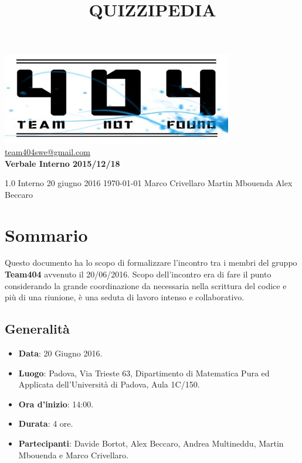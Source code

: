 \documentclass[a4paper,11pt]{article}
\title{\textbf{{\fontsize{10mm}{6mm}\selectfont QUIZZIPEDIA}}}
\begin{document}
	\maketitle
	
	\begin{center}

	\includegraphics{../../../team_not_found.jpg}\\	
	\fontsize{5mm}{3mm}\url{team404swe@gmail.com}\\
	\vspace{40mm}
	\textbf{ Verbale Interno 2015/12/18 }
	\end{center}
	\thispagestyle{empty}	%
			{1.0} 							%
			{Interno} 						%
			{20 giugno 2016} 				%
			{\today} 						%
			{Marco Crivellaro}				%
			{Martin Mbouenda} 			%
			{Alex Beccaro} 				%
	 
	\newpage
	\section{Sommario}
	Questo documento ha lo scopo di formalizzare l'incontro tra i membri del gruppo \textbf{Team404} avvenuto il 20/06/2016. Scopo dell'incontro era di fare il punto considerando la grande coordinazione da necessaria nella scrittura del codice e più di una riunione, è una seduta di lavoro intenso e collaborativo. 
	\subsection{Generalità}
	\begin{itemize}
	\item\textbf{Data}: 20 Giugno 2016.
	\item\textbf{Luogo}: Padova, Via Trieste 63, Dipartimento di Matematica Pura ed Applicata dell'Università di Padova, Aula 1C/150.
	\item\textbf{Ora d'inizio}: 14:00.
	\item\textbf{Durata}: 4 ore.
	\item\textbf{Partecipanti}: Davide Bortot, Alex Beccaro, Andrea Multineddu, Martin  Mbouenda e Marco Crivellaro.
	\end{itemize}
\end{document}
